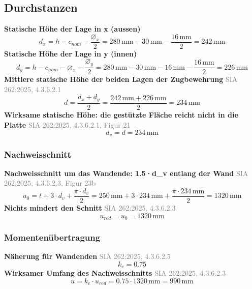 \documentclass[11pt,a4paper]{article}
\newcommand{\normref}[1]{{\small\textcolor{gray}{#1}}}
\begin{document}
\subsection{Durchstanzen}
\noindent\textbf{Statische Höhe der Lage in x (aussen)}
\begin{equation*}
d_x = h - c_{nom} - \frac{\varnothing_x}{2} = 280\,\mathrm{mm} - 30\,\mathrm{mm} - \frac{16\,\mathrm{mm}}{2} = 242\,\mathrm{mm}
\end{equation*}
\noindent\textbf{Statische Höhe der Lage in y (innen)}
\begin{equation*}
d_y = h - c_{nom} - \varnothing_x - \frac{\varnothing_y}{2} = 280\,\mathrm{mm} - 30\,\mathrm{mm} - 16\,\mathrm{mm} - \frac{16\,\mathrm{mm}}{2} = 226\,\mathrm{mm}
\end{equation*}
\noindent\textbf{Mittlere statische Höhe der beiden Lagen der Zugbewehrung} \hfill \normref{SIA 262:2025, 4.3.6.2.1}
\begin{equation*}
d = \frac{d_x + d_y}{2} = \frac{242\,\mathrm{mm} + 226\,\mathrm{mm}}{2} = 234\,\mathrm{mm}
\end{equation*}
\noindent\textbf{Wirksame statische Höhe: die gestützte Fläche reicht nicht in die Platte} \hfill \normref{SIA 262:2025, 4.3.6.2.1, Figur 21}
\begin{equation*}
d_v = d = 234\,\mathrm{mm}
\end{equation*}
\subsubsection{Nachweisschnitt}
\noindent\textbf{Nachweisschnitt um das Wandende: 1.5·d\_v entlang der Wand} \hfill \normref{SIA 262:2025, 4.3.6.2.3, Figur 23b}
\begin{equation*}
u_0 = t + 3 \cdot d_v + \frac{\pi \cdot d_v}{2} = 250\,\mathrm{mm} + 3 \cdot 234\,\mathrm{mm} + \frac{\pi \cdot 234\,\mathrm{mm}}{2} = 1320\,\mathrm{mm}
\end{equation*}
\noindent\textbf{Nichts mindert den Schnitt} \hfill \normref{SIA 262:2025, 4.3.6.2.3}
\begin{equation*}
u_{red} = u_0 = 1320\,\mathrm{mm}
\end{equation*}
\subsubsection{Momentenübertragung}
\noindent\textbf{Näherung für Wandenden} \hfill \normref{SIA 262:2025, 4.3.6.2.5}
\begin{equation*}
k_e = 0.75
\end{equation*}
\noindent\textbf{Wirksamer Umfang des Nachweisschnitts} \hfill \normref{SIA 262:2025, 4.3.6.2.3}
\begin{equation*}
u = k_e \cdot u_{red} = 0.75 \cdot 1320\,\mathrm{mm} = 990\,\mathrm{mm}
\end{equation*}
\end{document}
